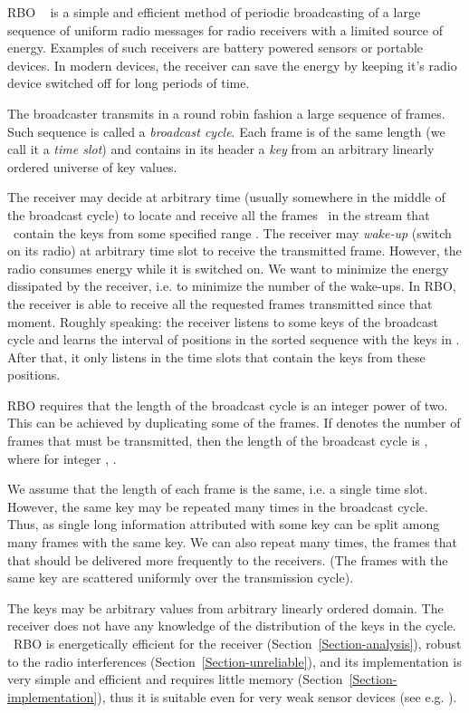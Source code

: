 \documentclass{article}
\newcommand{\tmem}[1]{{\em #1\/}}
\begin{document}
RBO \ {\cite{DBLP:journals/corr/abs-1108-5095}} is a simple and efficient
method of periodic broadcasting of a large sequence of uniform radio messages
for radio receivers with a limited source of energy. Examples of such
receivers are battery powered sensors or portable devices. In modern devices,
the receiver can save the energy by keeping it's radio device switched off for
long periods of time.

The broadcaster transmits in a round robin fashion a large sequence of frames.
Such sequence is called a {\tmem{broadcast cycle}}. Each frame is of the same
length (we call it a {\tmem{time slot}}) and contains in its header a
{\tmem{key}} from an arbitrary linearly ordered universe of key values.

The receiver may decide at arbitrary time (usually somewhere in the middle of
the broadcast cycle) to locate and receive all the frames \ in the stream that
\ contain the keys from some specified range . The
receiver may {\tmem{wake-up}} (switch on its radio) at arbitrary time slot to
receive the transmitted frame. However, the radio consumes energy while it is
switched on. We want to minimize the energy dissipated by the receiver, i.e.
to minimize the number of the wake-ups. In RBO, the receiver is able to
receive all the requested frames transmitted since that moment. Roughly
speaking: the receiver listens to some keys of the broadcast cycle and learns
the interval of positions in the sorted sequence with the keys in . After that, it only listens in the time slots that contain the
keys from these positions.

RBO requires that the length of the broadcast cycle is an integer power of
two. This can be achieved by duplicating some of the frames. If  denotes
the number of frames that must be transmitted, then the length of the
broadcast cycle is , where for integer , .

We assume that the length of each frame is the same, i.e. a single time slot.
However, the same key may be repeated many times in the broadcast cycle. Thus,
as single long information attributed with some key can be split among many
frames with the same key. We can also repeat many times, the frames that that
should be delivered more frequently to the receivers. (The frames with the
same key are scattered uniformly over the transmission cycle).

The keys may be arbitrary values from arbitrary linearly ordered domain.
The receiver does not have any knowledge of the distribution of the keys in
the cycle. \ RBO is energetically efficient for the receiver
(Section~\ref{Section-analysis}), robust to the radio interferences
(Section~\ref{Section-unreliable}), and its implementation is very simple and
efficient and requires little memory (Section~\ref{Section-implementation}),
thus it is suitable even for very weak sensor devices (see e.g.
{\cite{TinyOSProgramming}}).
\end{document}
